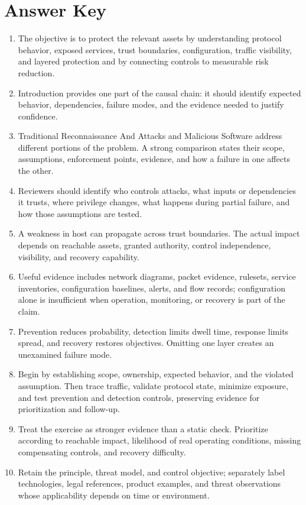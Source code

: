 \documentclass[11pt]{article}
\begin{document}
\section*{Answer Key}
\begin{enumerate}
\item The objective is to protect the relevant assets by understanding protocol behavior, exposed services, trust boundaries, configuration, traffic visibility, and layered protection and by connecting controls to measurable risk reduction.
\item Introduction provides one part of the causal chain: it should identify expected behavior, dependencies, failure modes, and the evidence needed to justify confidence.
\item Traditional Reconnaissance And Attacks and Malicious Software address different portions of the problem. A strong comparison states their scope, assumptions, enforcement points, evidence, and how a failure in one affects the other.
\item Reviewers should identify who controls attacks, what inputs or dependencies it trusts, where privilege changes, what happens during partial failure, and how those assumptions are tested.
\item A weakness in host can propagate across trust boundaries. The actual impact depends on reachable assets, granted authority, control independence, visibility, and recovery capability.
\item Useful evidence includes network diagrams, packet evidence, rulesets, service inventories, configuration baselines, alerts, and flow records; configuration alone is insufficient when operation, monitoring, or recovery is part of the claim.
\item Prevention reduces probability, detection limits dwell time, response limits spread, and recovery restores objectives. Omitting one layer creates an unexamined failure mode.
\item Begin by establishing scope, ownership, expected behavior, and the violated assumption. Then trace traffic, validate protocol state, minimize exposure, and test prevention and detection controls, preserving evidence for prioritization and follow-up.
\item Treat the exercise as stronger evidence than a static check. Prioritize according to reachable impact, likelihood of real operating conditions, missing compensating controls, and recovery difficulty.
\item Retain the principle, threat model, and control objective; separately label technologies, legal references, product examples, and threat observations whose applicability depends on time or environment.
\end{enumerate}
\end{document}
